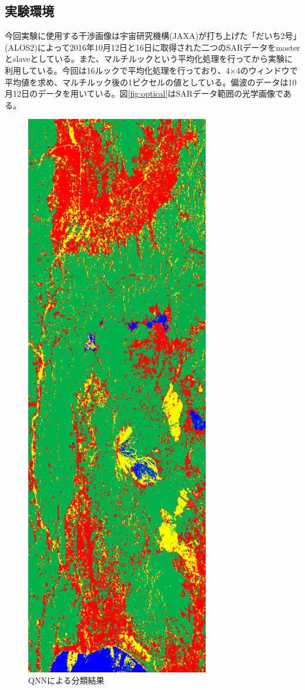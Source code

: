 \documentclass[a4j, twocolumn]{jsarticle}
\begin{document}
\subsection{実験環境}
今回実験に使用する干渉画像は宇宙研究機構(JAXA)が打ち上げた「だいち2号」(ALOS2)によって2016年10月12日と16日に取得された二つのSARデータをmasterとslaveとしている。また、マルチルックという平均化処理を行ってから実験に利用している。今回は16ルックで平均化処理を行っており、4$\times$4のウィンドウで平均値を求め、マルチルック後の1ピクセルの値としている。偏波のデータは10月12日のデータを用いている。図\ref{fig:optical}はSARデータ範囲の光学画像である。
 \begin{figure}[!t]
 \centering
 \includegraphics[width=8cm]{rgb_qnn.png}
 \caption{QNNによる分類結果}
 \label{qnn}
\end{figure}
\end{document}
